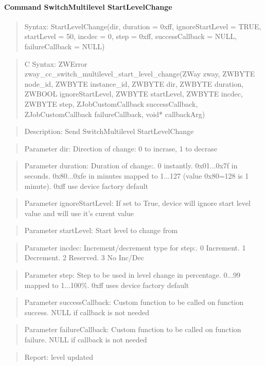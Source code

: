 \paragraph{Command SwitchMultilevel StartLevelChange}
\begin{quote}Syntax: StartLevelChange(dir, duration = 0xff, ignoreStartLevel = TRUE, startLevel = 50, incdec = 0, step = 0xff, successCallback = NULL, failureCallback = NULL)\end{quote}
\begin{quote}C Syntax: ZWError zway\_cc\_switch\_multilevel\_start\_level\_change(ZWay zway, ZWBYTE node\_id, ZWBYTE instance\_id, ZWBYTE dir, ZWBYTE duration, ZWBOOL ignoreStartLevel, ZWBYTE startLevel, ZWBYTE incdec, ZWBYTE step, ZJobCustomCallback successCallback, ZJobCustomCallback failureCallback, void* callbackArg)\end{quote}
\begin{quote}Description: Send SwitchMultilevel StartLevelChange\end{quote}
\begin{quote}Parameter dir: Direction of change: 0 to incrase, 1 to decrase\end{quote}
\begin{quote}Parameter duration: Duration of change:. 0 instantly. 0x01...0x7f in seconds. 0x80...0xfe in minutes mapped to 1...127 (value 0x80=128 is 1 minute). 0xff use device factory default\end{quote}
\begin{quote}Parameter ignoreStartLevel: If set to True, device will ignore start level value and will use it's curent value\end{quote}
\begin{quote}Parameter startLevel: Start level to change from\end{quote}
\begin{quote}Parameter incdec: Increment/decrement type for step:. 0 Increment. 1 Decrement. 2 Reserved. 3 No Inc/Dec\end{quote}
\begin{quote}Parameter step: Step to be used in level change in percentage. 0...99 mapped to 1...100\%. 0xff uses device factory default\end{quote}
\begin{quote}Parameter successCallback: Custom function to be called on function success. NULL if callback is not needed\end{quote}
\begin{quote}Parameter failureCallback: Custom function to be called on function failure. NULL if callback is not needed\end{quote}
\begin{quote}Report: level updated\end{quote}

